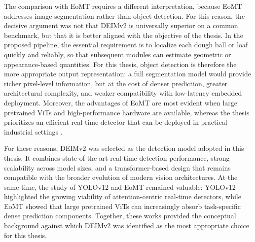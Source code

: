 The comparison with EoMT requires a different interpretation, because EoMT addresses image segmentation rather than object detection. For this reason, the decisive argument was not that DEIMv2 is universally superior on a common benchmark, but that it is better aligned with the objective of the thesis. In the proposed pipeline, the essential requirement is to localize each dough ball or loaf quickly and reliably, so that subsequent modules can estimate geometric or appearance-based quantities. For this thesis, object detection is therefore the more appropriate output representation: a full segmentation model would provide richer pixel-level information, but at the cost of denser prediction, greater architectural complexity, and weaker compatibility with low-latency embedded deployment. Moreover, the advantages of EoMT are most evident when large pretrained ViTs and high-performance hardware are available, whereas the thesis prioritizes an efficient real-time detector that can be deployed in practical industrial settings \cite{kerssies_your_2025}.

For these reasons, DEIMv2 was selected as the detection model adopted in this thesis. It combines state-of-the-art real-time detection performance, strong scalability across model sizes, and a transformer-based design that remains compatible with the broader evolution of modern vision architectures. At the same time, the study of YOLOv12 and EoMT remained valuable: YOLOv12 highlighted the growing viability of attention-centric real-time detectors, while EoMT showed that large pretrained ViTs can increasingly absorb task-specific dense prediction components. Together, these works provided the conceptual background against which DEIMv2 was identified as the most appropriate choice for this thesis.
